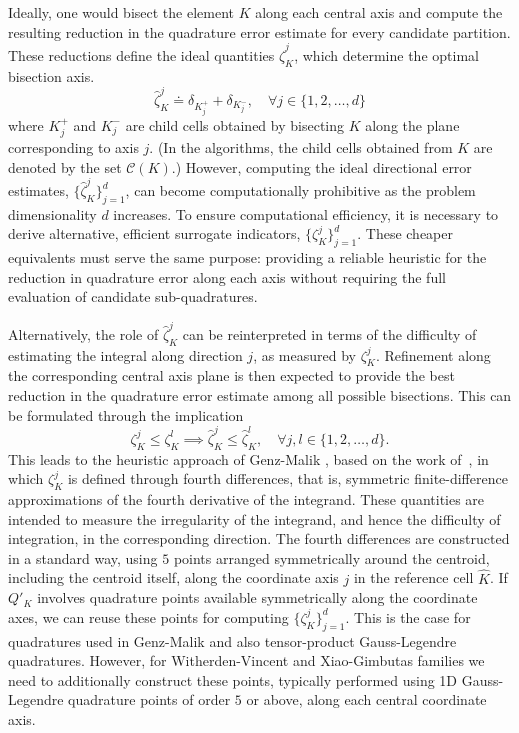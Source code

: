 \documentclass[oneside,reqno,11pt,a4paper]{amsart}
\theoremstyle{definition}
\begin{document}
Ideally, one would bisect the element $K$ along each central axis and compute
the resulting reduction in the quadrature error estimate for every candidate
partition. These reductions define the ideal quantities
$\widehat \zeta^j_K$, which determine the optimal bisection axis.
\begin{equation} \label{eq:ideal-dir-estimate}
\widehat \zeta^j_K \doteq \delta_{K^{+}_j} + \delta_{K^{-}_j}, \quad \forall j \in \{1,2, \ldots, d\}
\end{equation}
where $K^{+}_j$ and $K^{-}_j$ are child cells obtained by bisecting $K$
along the plane corresponding to axis $j$. (In the algorithms, the child cells
obtained from $K$ are denoted by the set $\mathcal{C}(K)$.)
However, computing the ideal directional error estimates,
$\{\widehat{\zeta}^j_K\}_{j=1}^d$, can become computationally prohibitive as
the problem dimensionality $d$ increases. To ensure computational efficiency,
it is necessary to derive alternative, efficient surrogate indicators,
$\{\zeta^j_K\}_{j=1}^d$. These cheaper equivalents must serve the same purpose:
providing a reliable heuristic for the reduction in quadrature error along each
axis without requiring the full evaluation of candidate sub-quadratures.

Alternatively, the role of $\widehat{\zeta}^j_K$ can be reinterpreted in terms
of the difficulty of estimating the integral along direction $j$, as measured
by $\zeta^j_K$. Refinement along the corresponding central axis plane is then
expected to provide the best reduction in the quadrature error estimate among
all possible bisections. This can be formulated through the implication
\begin{equation}
  \zeta^j_K \leq \zeta^l_K \implies \widehat{\zeta}^j_K \leq \widehat{\zeta}^l_K, \quad \forall j, l \in \{1,2, \ldots, d\}.
\end{equation}
This leads to the heuristic approach of Genz-Malik
\cite{GenzMalik1980}, based on the work of~\cite{VDooren1976}, in which
$\zeta^j_K$ is defined through fourth differences,
that is, symmetric finite-difference approximations of the fourth derivative of
the integrand. These quantities are intended to measure the irregularity of the
integrand, and hence the difficulty of integration, in the corresponding
direction. The fourth differences are constructed in a standard way, using $5$ points
arranged symmetrically around the centroid, including the centroid itself,
along the coordinate axis $j$ in the reference cell $\widehat{K}$. If $Q'_K$
involves quadrature points
available symmetrically along the coordinate axes, we can reuse these points
for computing $\{\zeta^j_K\}_{j=1}^d$. This is the case for quadratures used in
Genz-Malik and also tensor-product Gauss-Legendre quadratures. However, for
Witherden-Vincent and Xiao-Gimbutas families we need to additionally construct
these points, typically performed using 1D Gauss-Legendre quadrature points of
order $5$ or above, along each central coordinate axis.
\end{document}
